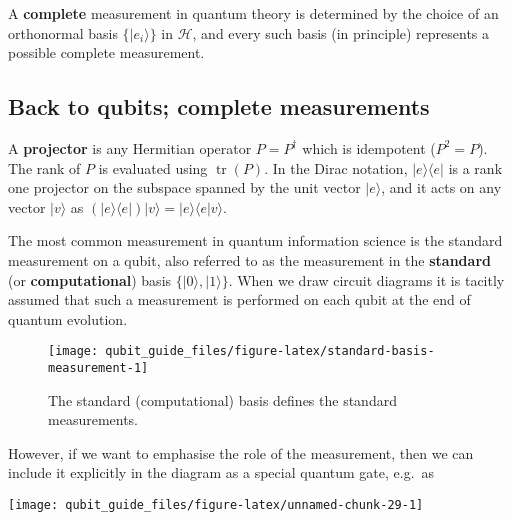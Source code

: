 \documentclass[fleqn]{article}
\newenvironment{idea}{\noindent}{\medskip}
\begin{document}
\begin{idea}
A \textbf{complete} measurement in quantum theory is determined by the choice of an orthonormal basis \(\{|e_i\rangle\}\) in \(\mathcal{H}\), and every such basis (in principle) represents a possible complete measurement.

\end{idea}

\hypertarget{back-to-qubits-complete-measurements}{%
\subsection{Back to qubits; complete measurements}\label{back-to-qubits-complete-measurements}}

\begin{idea}
A \textbf{projector} is any Hermitian operator \(P=P^\dagger\) which is idempotent (\(P^2=P\)).
The rank of \(P\) is evaluated using \(\operatorname{tr}(P)\).
In the Dirac notation, \(|e\rangle\langle e|\) is a rank one projector on the subspace spanned by the unit vector \(|e\rangle\), and it acts on any vector \(|v\rangle\) as \((|e\rangle\langle e|)|v\rangle = |e\rangle\langle e|v\rangle\).

\end{idea}

The most common measurement in quantum information science is the standard measurement on a qubit, also referred to as the measurement in the \textbf{standard} (or \textbf{computational}) basis \(\{|0\rangle,|1\rangle\}\).
When we draw circuit diagrams it is tacitly assumed that such a measurement is performed on each qubit at the end of quantum evolution.

\begin{figure}[H]

{\centering \texttt{[image: qubit\_guide\_files/figure-latex/standard-basis-measurement-1]} 

}

\caption{The standard (computational) basis defines the standard measurements.}\label{fig:standard-basis-measurement}
\end{figure}

However, if we want to emphasise the role of the measurement, then we can include it explicitly in the diagram as a special quantum gate, e.g.~as

\begin{center}\texttt{[image: qubit\_guide\_files/figure-latex/unnamed-chunk-29-1]} \end{center}
\end{document}
